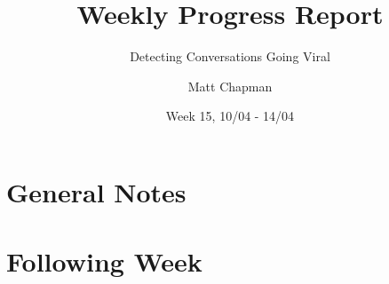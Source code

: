\documentclass{mattreport}
\title{Weekly Progress Report}
\subtitle{Detecting Conversations Going Viral}
\date{Week 15, 10/04 - 14/04}
\author{Matt Chapman}
\begin{document}
\maketitle

\section{General Notes}

\section{Following Week}

\newpage
\printbibliography
\end{document}
